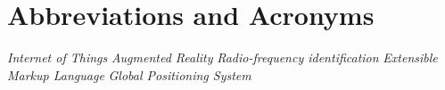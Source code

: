 \documentclass[conference]{IEEEtran}
\begin{document}

\section*{Abbreviations and Acronyms}
\begin{acronym}[Bash]
 {\textit{Internet of Things}}
 {\textit{Augmented Reality}}
 {\textit{Radio-frequency identification}}
 {\textit{Extensible Markup Language}}
 {\textit{Global Positioning System}}
\end{acronym}

\printbibliography
\end{document}
